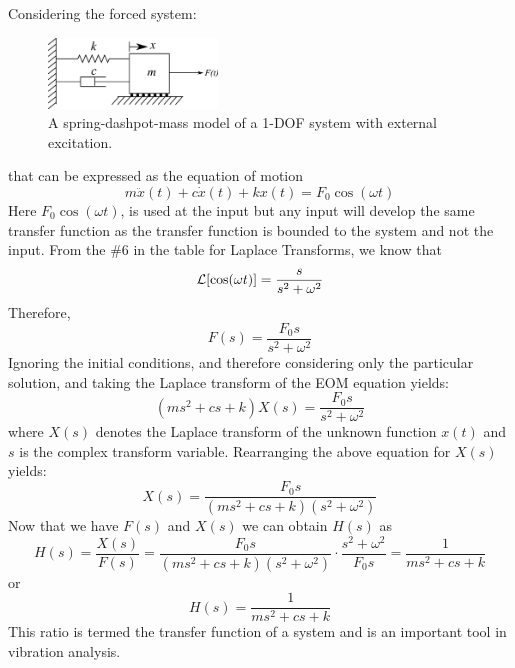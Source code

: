\documentclass[12pt,letter]{article}
\begin{document}
Considering the forced system:
\begin{figure}[H]
	\centering
	\includegraphics[width=0.4\textwidth]{../figures/1-DOF-spring_dashpot_mass_horizontal_forced.png}
	\caption{A spring-dashpot-mass model of a 1-DOF system with external excitation.}
\end{figure}
\noindent that can be expressed as the equation of motion
\begin{equation}
	m\ddot{x}(t) + c\dot{x}(t) +kx(t) = F_0 \cos(\omega t)
\end{equation}
Here $F_0 \cos(\omega t)$, is used at the input but any input will develop the same transfer function as the transfer function is bounded to the system and not the input. From the \#6 in the table for Laplace Transforms, we know that
\begin{equation}
	\mathcal{L}{\left[\cos(\omega t)\right]} = \frac{s}{s^2+\omega^2}
\end{equation}
Therefore, 
\begin{equation}
F(s) = \frac{F_0s}{s^2+\omega^2}
\end{equation}
Ignoring the initial conditions, and therefore considering only the particular solution, and taking the Laplace transform of the EOM equation yields:
\begin{equation}
(ms^2 + cs +k)X(s) = \frac{F_0s}{s^2+\omega^2} 
\end{equation}
where $X(s)$ denotes the Laplace transform of the unknown function $x(t)$ and $s$ is the complex transform variable. Rearranging the above equation for $X(s)$ yields: 
\begin{equation}
X(s) = \frac{F_0s}{(ms^2 + cs +k)(s^2+\omega^2)}
\end{equation}
Now that we have $F(s)$ and $X(s)$ we can obtain $H(s)$ as  
\begin{equation}
H(s) = \frac{X(s)}{F(s)} = \frac{F_0s}{(ms^2 + cs +k)(s^2+\omega^2)} \cdot \frac{s^2+\omega^2}{F_0s} = \frac{1}{ms^2+cs+k}
\end{equation}
or 
\begin{equation}
H(s) = \frac{1}{ms^2+cs+k}
\end{equation}
This ratio is termed the transfer function of a system and is an important tool in vibration analysis.
\end{document}
